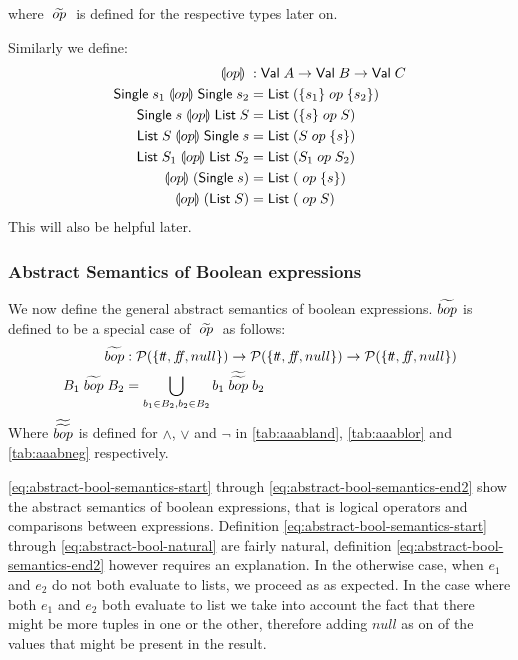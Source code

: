 where $\;\widetilde{op}\;$ is defined for the respective types later on.

Similarly we define:
\begin{align}
    \;\llparenthesis op\rrparenthesis\; &: \mathsf{Val} \; A \rightarrow \mathsf{Val} \; B \rightarrow \mathsf{Val} \; C \\
    \mathsf{Single} \; s_1 \;\llparenthesis op\rrparenthesis\; \mathsf{Single} \; s_2 &= \mathsf{List} \; (\{s_1\} \;op\; \{s_2\}) \\
    \mathsf{Single} \; s \;\llparenthesis op\rrparenthesis\; \mathsf{List} \; S &= \mathsf{List} \; (\{ s \} \;op\; S) \\
    \mathsf{List} \; S \;\llparenthesis op\rrparenthesis\; \mathsf{Single} \; s &= \mathsf{List} \; (S \;op\; \{ s \})  \\
    \mathsf{List} \; S_1 \;\llparenthesis op\rrparenthesis\; \mathsf{List} \; S_2 &= \mathsf{List} \; (S_1 \;op\; S_2) \\
    \;\llparenthesis op\rrparenthesis\; (\mathsf{Single} \; s) &= \mathsf{List} \; (\;op\; \{ s \}) \\
    \;\llparenthesis op\rrparenthesis\; (\mathsf{List} \; S) &= \mathsf{List} \; (\;op\; S )
\end{align}
This will also be helpful later.

\subsubsection{Abstract Semantics of Boolean expressions}
We now define the general abstract semantics of boolean expressions.
$\widetilde{bop}$ is defined to be a special case of $\;\widetilde{op}\;$ as follows:
\begin{align}
    \aab{bop} &: \mathcal{P}(\{\true, \false, null\}) \rightarrow \mathcal{P}(\{\true, \false, null\}) \rightarrow \mathcal{P}(\{\true, \false, null\})\\
    B_1 \;\aab{bop}\; B_2 &= \bigcup_{b_1 \in B_2, b_2 \in B_2} b_1 \;\aaab{bop}\; b_2
\end{align}
Where $\widetilde{\widetilde{bop}}$ is defined for $\land$, $\lor$ and $\neg$ in \autoref{tab:aaabland}, \autoref{tab:aaablor} and \autoref{tab:aaabneg} respectively.

\autoref{eq:abstract-bool-semantics-start} through \ref{eq:abstract-bool-semantics-end2} show the abstract semantics of boolean expressions, that is logical operators and comparisons between expressions.
Definition \ref{eq:abstract-bool-semantics-start} through \ref{eq:abstract-bool-natural} are fairly natural, definition \ref{eq:abstract-bool-semantics-end2} however requires an explanation.
In the otherwise case, when $e_1$ and $e_2$ do not both evaluate to lists, we proceed as as expected.
In the case where both $e_1$ and $e_2$ both evaluate to list we take into account the fact that there might be more tuples in one or the other, therefore adding $null$ as on of the values that might be present in the result.

